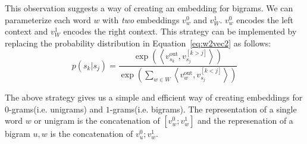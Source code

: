 \documentclass{article}
\renewcommand{\eqref}[1]{Equation~\ref{#1}}
\newcommand{\vo}[1]{v^{\textrm{out}}_{#1}}
\newcommand{\ip}[2]{\left\langle#1, #2\right\rangle}
\begin{document}
This observation suggests a way of creating an embedding for bigrams. We can
parameterize each word $w$ with \textit{two} embeddings $v_w^0$ and $v_W^1$.
$v_w^0$ encodes the left context and $v_W^1$ encodes the right context.
This strategy can be implemented by replacing the probability distribution in
\eqref{eq:w2vec2} as follows:
\begin{equation}\label{eq:w2vec3}
  p(s_k | s_j) = \frac{\exp\left(\ip{\vo{s_k}}{v_{s_j}^{[k>j]}}\right)}{\exp\left(\sum_{w \in W}\ip{\vo{w}}{v_{s_j}^{[k<j]}}\right)}
\end{equation}

The above strategy gives us a simple and efficient way of creating embeddings
for $0$-grams(i.e. unigrams) and $1$-grams(i.e. bigrams). The representation of
a single word $w$ or unigram is the concatenation of $[v_w^0; v_w^1]$ and the
represenation of a bigram $u,w$ is the concatenation of $v_u^0; v_w^1$.
\end{document}
